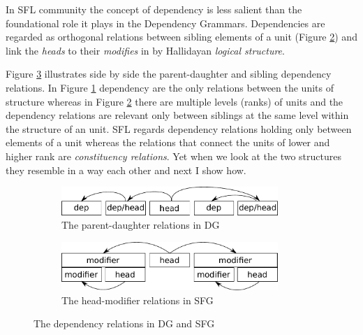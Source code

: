 

In SFL community the concept of dependency is less salient than the foundational role it plays in the Dependency Grammars. Dependencies are regarded as orthogonal relations between sibling elements of a unit (Figure \ref{fig:dependecy-sfg}) and link the \textit{heads} to their \textit{modifies} in by Hallidayan \textit{logical structure}\citep{Halliday2013}. 


Figure \ref{fig:dependency-relations} illustrates side by side the parent-daughter and sibling dependency relations. In Figure \ref{fig:dependecy-dg} dependency are the only relations between the units of structure whereas in Figure \ref{fig:dependecy-sfg} there are multiple levels (ranks) of units and the dependency relations are relevant only between siblings at the same level within the structure of an unit. SFL regards dependency relations holding only between elements of a unit whereas the relations that connect the units of lower and higher rank are \textit{constituency relations}. Yet when we look at the two structures they resemble in a way each other and next I show how. 

\begin{figure}[hbtp]
	\centering
	\begin{subfigure}{.5\textwidth}
		\centering
		\includegraphics[width=0.9\textwidth]{Figures/SFL-grammar/dependency-dg.pdf}
		\vspace{+22pt}
		\caption{The parent-daughter relations in DG}
		\label{fig:dependecy-dg}
	\end{subfigure}%
	\begin{subfigure}{.5\textwidth}
		\centering
		\includegraphics[width=0.9\textwidth]{Figures/SFL-grammar/dependency-sfg.pdf}
		\caption{The head-modifier relations in SFG}
		\label{fig:dependecy-sfg}
	\end{subfigure}
	\caption{The dependency relations in DG and SFG}
	\label{fig:dependency-relations}
\end{figure}

